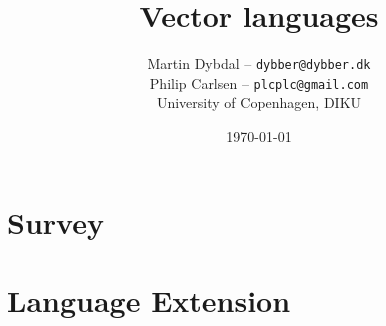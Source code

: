 \documentclass[10pt,a4paper,final,oneside,openany]{memoir}
\title{Vector languages }
\author{
  Martin Dybdal -- \texttt{dybber@dybber.dk} \\
  Philip Carlsen -- \texttt{plcplc@gmail.com}
\\
University of Copenhagen, DIKU}
\date{\today}
\begin{document}


\newpage
\renewcommand*{\cftpartname}{Part\space}
\tableofcontents*





\part{Survey}


\part{Language Extension}



\newpage
{}
\printbibliography
\end{document}
